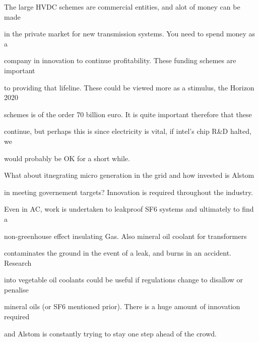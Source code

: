 The large HVDC schemes are commercial entities, and alot of money can be made 

in the private market for new transmission systems. You need to spend money as a 

company in innovation to continue profitability. These funding schemes are important 

to providing that lifeline. These could be viewed more as a stimulus, the Horizon 2020 

schemes is of the order 70 billion euro. It is quite important therefore that these 

continue, but perhaps this is since electricity is vital, if intel's chip R\&D halted, we 

would probably be OK for a short while.

What about itnegrating micro generation in the grid and how invested is Alstom 

in meeting governement targets? Innovation is required throughout the industry. 

Even in AC, work is undertaken to leakproof SF6 systems and ultimately to find a 

non-greenhouse effect insulating Gas. Also mineral oil coolant for transformers 

contaminates the ground in the event of a leak, and burns in an accident. Research 

into vegetable oil coolants could be useful if regulations change to disallow or penalise 

mineral oils (or SF6 mentioned prior). There is a huge amount of innovation required 

and Alstom is constantly trying to stay one step ahead of the crowd.


